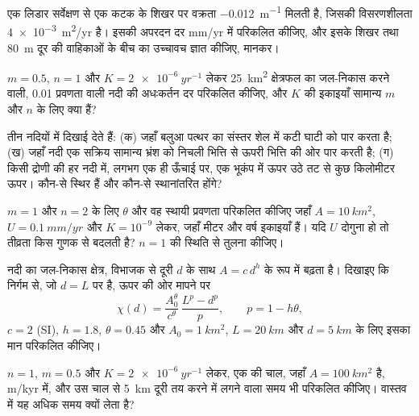 \begin{exercise}[$\star$]\label{exo:b3:quantitative-geomorphology:2}
एक लिडार सर्वेक्षण से एक कटक के शिखर पर वक्रता \qty{-0.012}{m^{-1}} मिलती है,
जिसकी विसरणशीलता \qty{4e-3}{m^2/yr} है। इसकी अपरदन दर
\unit{mm/yr} में परिकलित कीजिए, और इसके शिखर तथा
\qty{80}{m} दूर की वाहिकाओं के बीच का उच्चावच ज्ञात कीजिए,  मानकर।
\end{exercise}

\begin{exercise}[$\star$]\label{exo:b3:quantitative-geomorphology:3}
$m = 0.5$, $n = 1$ और $K = \qty{2e-6}{yr^{-1}}$ लेकर
\qty{25}{km^2} क्षेत्रफल का जल-निकास करने वाली, 0.01 प्रवणता वाली नदी की अधःकर्तन दर परिकलित कीजिए,
और $K$ की इकाइयाँ सामान्य $m$ और $n$ के लिए क्या हैं?
\end{exercise}

\begin{exercise}[$\star$]\label{exo:b3:quantitative-geomorphology:4}
तीन नदियों में  दिखाई देते हैं: (क) जहाँ बलुआ पत्थर का संस्तर शेल में कटी
घाटी को पार करता है; (ख) जहाँ नदी एक सक्रिय सामान्य भ्रंश को निचली भित्ति से
ऊपरी भित्ति की ओर पार करती है; (ग) किसी द्रोणी की हर नदी में, लगभग एक ही ऊँचाई पर,
एक भूकंप में ऊपर उठे तट से कुछ किलोमीटर ऊपर।
कौन-से स्थिर हैं और कौन-से स्थानांतरित होंगे?
\end{exercise}

\begin{exercise}[$\star\star$]\label{exo:b3:quantitative-geomorphology:5}
$m = 1$ और $n = 2$ के लिए $\theta$ और वह स्थायी प्रवणता परिकलित कीजिए जहाँ $A =
\qty{10}{km^2}$, $U = \qty{0.1}{mm/yr}$ और $K = 10^{-9}$ लेकर, जहाँ मीटर और
वर्ष इकाइयाँ हैं।
यदि $U$ दोगुना हो तो तीव्रता किस गुणक से बदलती है? $n =
1$ की स्थिति से तुलना कीजिए।
\end{exercise}

\begin{exercise}[$\star\star$]\label{exo:b3:quantitative-geomorphology:6}
नदी का जल-निकास क्षेत्र, विभाजक से दूरी $d$ के साथ $A =
c\,d^{h}$ के रूप में बढ़ता है। दिखाइए कि निर्गम से, जो $d = L$ पर है, ऊपर की ओर मापने पर
\[
\chi(d) = \frac{A_0^{\theta}}{c^{\theta}}\,\frac{L^{p} - d^{p}}{p},
\qquad p = 1 - h\theta ,
\]
$c = 2$ (SI), $h = 1.8$, $\theta = 0.45$ और $A_0 =
\qty{1}{km^2}$, $L = \qty{20}{km}$ और $d = \qty{5}{km}$ के लिए इसका मान परिकलित कीजिए।
\end{exercise}

\begin{exercise}[$\star\star$]\label{exo:b3:quantitative-geomorphology:7}
$n = 1$, $m = 0.5$ और $K = \qty{2e-6}{yr^{-1}}$ लेकर, एक  की चाल,
जहाँ $A = \qty{100}{km^2}$ है, m/kyr में, और
उस चाल से \qty{5}{km} दूरी तय करने में लगने वाला समय भी परिकलित कीजिए। वास्तव में यह
अधिक समय क्यों लेता है?
\end{exercise}

